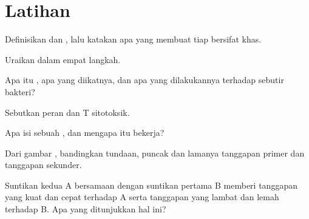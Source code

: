 \section{Latihan}

\begin{exercise}[$\star$]\label{exo:g12:adaptive-immunity:1}
Definisikan  dan , lalu katakan apa yang membuat tiap
 bersifat khas.
\end{exercise}

\begin{exercise}[$\star$]\label{exo:g12:adaptive-immunity:2}
Uraikan  dalam empat langkah.
\end{exercise}

\begin{exercise}[$\star$]\label{exo:g12:adaptive-immunity:3}
Apa itu , apa yang diikatnya, dan apa yang dilakukannya
terhadap sebutir bakteri?
\end{exercise}

\begin{exercise}[$\star$]\label{exo:g12:adaptive-immunity:4}
Sebutkan peran  dan  T sitotoksik.
\end{exercise}

\begin{exercise}[$\star$]\label{exo:g12:adaptive-immunity:5}
Apa isi sebuah , dan mengapa  itu bekerja?
\end{exercise}

\begin{exercise}[$\star\star$]\label{exo:g12:adaptive-immunity:6}
Dari gambar , bandingkan tundaan, puncak dan lamanya tanggapan
primer dan tanggapan sekunder.
\end{exercise}

\begin{exercise}[$\star\star$]\label{exo:g12:adaptive-immunity:7}
Suntikan kedua  A bersamaan dengan suntikan pertama  B
memberi tanggapan yang kuat dan cepat terhadap A serta tanggapan yang
lambat dan lemah terhadap B. Apa yang ditunjukkan hal ini?
\end{exercise}

